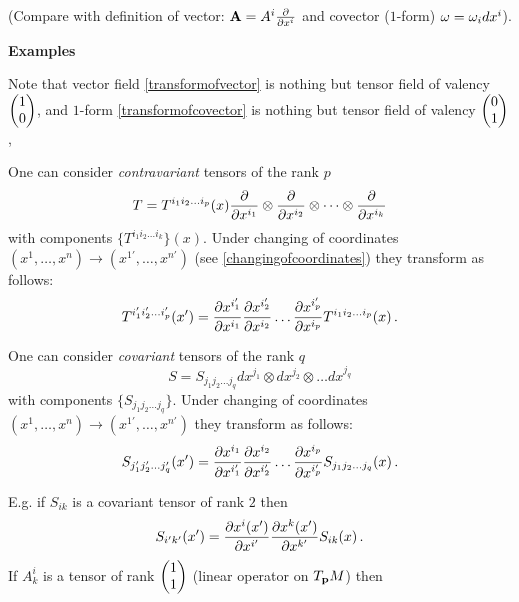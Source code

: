 \documentclass[12pt]{article}
\theoremstyle{theorem}
\numberwithin{equation}{section}
\begin{document}
(Compare with definition of vector: ${\bf A}=A^i{\partial\over \partial x^i}$
and covector ($1$-form) $\omega=\omega_idx^i$).



\centerline {\bf Examples}

\smallskip


    Note that vector field \eqref{transformofvector} is nothing but
 tensor field of valency 
$\begin{pmatrix}1 \cr 0\cr\end{pmatrix}$,
and $1$-form \eqref{transformofcovector} is nothing but
tensor field of valency 
$\begin{pmatrix}0 \cr 1\cr\end{pmatrix}$,

\medskip


One can consider {\it contravariant} tensors  of the rank $p$
                   $$
             T=  T^{i_1i_2\dots i_p}(x){\partial\over \partial x^{i_1}}\otimes
             {\partial\over \partial x^{i_2}}\otimes \dots \otimes {\partial\over \partial x^{i_k}}
                   $$
with components $\{T^{i_1i_2\dots i_k}\}(x)$.
Under changing of coordinates 
$(x^1,\dots,x^n)\to (x^{1'},\dots,x^{n'})$ (see
\eqref{changingofcoordinates}) they transform as follows:
            \begin{equation}\label{transformofcontrtensors}
T^{i'_1i'_2\dots i'_p}(x')={\partial x^{i'_1}\over \partial x^{i_1}}
                       {\partial x^{i'_2}\over \partial x^{i_2}}\dots
                       {\partial x^{i'_p}\over \partial x^{i_p}}
                     T^{i_1i_2\dots i_p}(x)\,.
                         \end{equation}

\medskip

One can consider {\it covariant} tensors  of the rank $q$
                   $$
             S=  S_{j_1j_2\dots j_q}dx^{j_1}\otimes
              dx^{j_2}\otimes \dots dx^{j_q}
                   $$
with components $\{S_{j_1j_2\dots j_q}\}$.
Under changing of coordinates 
$(x^1,\dots,x^n)\to (x^{1'},\dots,x^{n'})$ 
they transform as follows:
            \begin{equation*}\label{transformofcotensors}
S_{j'_1j'_2\dots j'_q}(x')={\partial x^{i_1}\over \partial x^{i'_1}}
                       {\partial x^{i_2}\over \partial x^{i'_2}}\dots
                       {\partial x^{i_p}\over \partial x^{i'_p}}
                     S_{j_1j_2\dots j_q}(x)\,.
                         \end{equation*}


E.g. if $S_{ik}$ is a covariant tensor
of rank $2$ then
            \begin{equation}\label{ruleoftransformfor2tensor}
                S_{i'k'}(x')=
   {\partial x^i(x')\over \partial x^{i'}}
   {\partial x^k(x')\over \partial x^{k'}}
             S_{ik}(x)\,.
            \end{equation}
 If $A^i_k$ is a tensor of rank $\begin{pmatrix} 1\cr 1\cr\end{pmatrix}$ 
(linear operator on $T_{\bf p} M$)
 then
\end{document}
